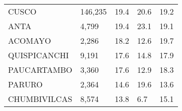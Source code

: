 \begin{tabular}{lllll}
	\cellcolor[HTML]{FF5050}CUSCO                                  & 146,235                                                               & 19.4                                                                             & 20.6                                                                        & 19.2                                                                                \\
	\cellcolor[HTML]{FF5050}ANTA                                   & 4,799                                                                 & 19.4                                                                             & 23.1                                                                        & 19.1                                                                                \\
	\cellcolor[HTML]{FF5050}ACOMAYO                                & 2,286                                                                 & 18.2                                                                             & 12.6                                                                        & 19.7                                                                                \\
	\cellcolor[HTML]{FF5050}QUISPICANCHI                           & 9,191                                                                 & 17.6                                                                             & 14.8                                                                        & 17.9                                                                                \\
	\cellcolor[HTML]{FF5050}PAUCARTAMBO                            & 3,360                                                                 & 17.6                                                                             & 12.9                                                                        & 18.3                                                                                \\
	\cellcolor[HTML]{FF5050}PARURO                                 & 2,364                                                                 & 14.6                                                                             & 19.6                                                                        & 13.6                                                                                \\
	\cellcolor[HTML]{FF5050}CHUMBIVILCAS                           & 8,574                                                                 & 13.8                                                                             & 6.7                                                                         & 15.1                                                                                \\

\end{tabular}
